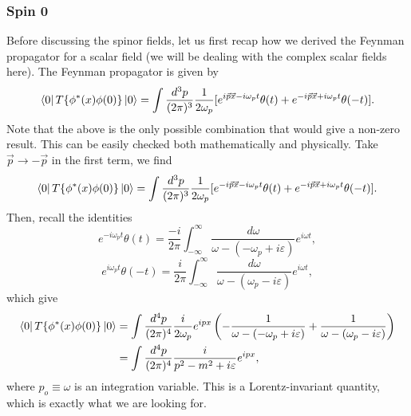 \documentclass[11pt]{article}
\theoremstyle{definition}
\begin{document}
\subsubsection{Spin 0}
Before discussing the spinor fields, let us first recap how we derived the Feynman propagator for a scalar field (we will be dealing with the complex scalar fields here). The Feynman propagator is given by
\begin{equation}
    \bra{0}T\{\phi^*(x)\phi(0)\}\ket{0} = \int \frac{d^3p}{(2\pi)^3}\frac{1}{2\omega_p} [e^{i\vec{p}\vec{x}-i\omega_pt}\theta(t) + e^{-i\vec{p}\vec{x}+i\omega_pt}\theta(-t)].
\end{equation}
Note that the above is the only possible combination that would give a non-zero result. This can be easily checked both mathematically and physically. Take $\vec{p} \to -\vec{p}$ in the first term, we find
\begin{equation}
    \bra{0}T\{\phi^*(x)\phi(0)\}\ket{0} = \int \frac{d^3p}{(2\pi)^3}\frac{1}{2\omega_p} [e^{-i\vec{p}\vec{x}-i\omega_pt}\theta(t) + e^{-i\vec{p}\vec{x}+i\omega_pt}\theta(-t)].
\end{equation}
Then, recall the identities
\begin{equation}
    e^{-i\omega_pt}\theta(t) = \frac{-i}{2\pi}\int^\infty_{-\infty}\frac{d\omega}{\omega-(-\omega_p+i\varepsilon)}e^{i\omega t},
    \label{EQ ST1}
\end{equation}
\begin{equation}
    e^{i\omega_pt}\theta(-t) = \frac{i}{2\pi}\int^\infty_{-\infty}\frac{d\omega}{\omega-(\omega_p-i\varepsilon)}e^{i\omega t},
    \label{EQ ST2}
\end{equation}
which give
\begin{equation}
\begin{aligned}
        \bra{0}T\{\phi^*(x)\phi(0)\}\ket{0} &= \int \frac{d^4p}{(2\pi)^4}\frac{i}{2\omega_p} e^{ipx}\left(-\frac{1}{\omega-(-\omega_p+i\varepsilon)} + \frac{1}{\omega-(\omega_p-i\varepsilon)} \right) \\
        &= \int \frac{d^4p}{(2\pi)^4}\frac{i}{p^2-m^2+i\varepsilon}e^{ipx},
\end{aligned}
\end{equation}
where $p_o \equiv \omega$  is an integration variable. This is a Lorentz-invariant quantity, which is exactly what we are looking for.
\end{document}
